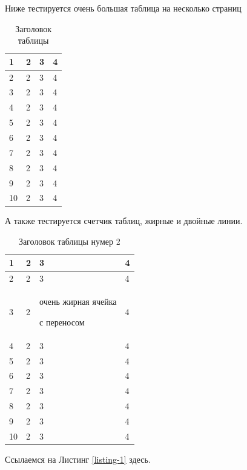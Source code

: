 \documentclass[a4paper,14pt]{extarticle}
\begin{document}
Ниже тестируется очень большая таблица на несколько страниц

\begin{center}
    \begin{longtable}{|p{2cm}|p{3cm}|p{7cm}|p{3cm}|}
    \caption{Заголовок таблицы}\\
    \hline
    1 & 2 & 3 & 4\\ 
    \hline 
    2 & 2 & 3 & 4\\
    \hline
    3 & 2 & 3 & 4\\
    \hline
    4 & 2 & 3 & 4\\
    \hline
    5 & 2 & 3 & 4\\
    \hline
    6 & 2 & 3 & 4\\
    \hline
    7 & 2 & 3 & 4\\
    \hline
    8 & 2 & 3 & 4\\
    \hline
    9 & 2 & 3 & 4\\
    \hline
    10 & 2 & 3 & 4\\
    \hline
    
    
    \end{longtable}
\end{center}


А также тестируется счетчик таблиц, жирные и двойные линии.

\begin{center}
    \begin{longtable}{|p{2cm}||p{3cm}|p{7cm}|p{3cm}|}
    \caption{Заголовок таблицы нумер 2}\\
    \hline
    1 & 2 & 3 & 4\\ 
    \hline
    2 & 2 & 3 & 4\\
    \hline
    3 & 2 & очень жирная ячейка \par с переносом & 4\\
    \hline
    4 & 2 & 3 & 4\\
    \hline
    5 & 2 & 3 & 4\\
    \hline
    6 & 2 & 3 & 4\\
    \hline
    7 & 2 & 3 & 4\\
    \hline
    8 & 2 & 3 & 4\\
    \hline
    9 & 2 & 3 & 4\\
    \hline
    10 & 2 & 3 & 4\\
    \hline
    
    
    \end{longtable}
\end{center}

Ссылаемся на Листинг \ref{listing-1} здесь.
\pagebreak
\end{document}
